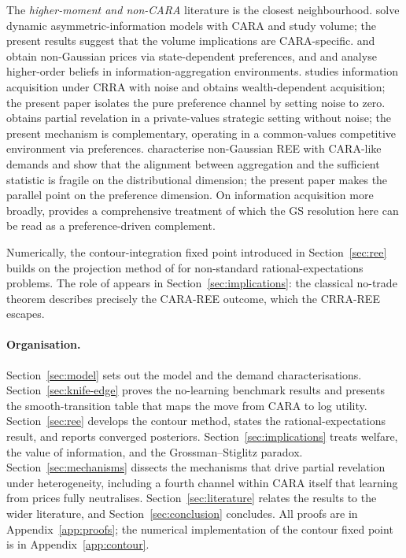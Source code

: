 \documentclass[12pt,letterpaper]{article}
\theoremstyle{definition}
\theoremstyle{remark}
\newcommand{\1}{\mathbf{1}}
\begin{document}
The \emph{higher-moment and non-CARA} literature is the closest
neighbourhood. \citet{Wang1993,Wang1994} solve dynamic
asymmetric-information models with CARA and study volume; the present
results suggest that the volume implications are CARA-specific.
\citet{BarlevyVeronesi2003} and \citet{Mele2007} obtain non-Gaussian
prices via state-dependent preferences, and \citet{AllenMorrisShin2006}
and \citet{KasaWalkerWhiteman2014} analyse higher-order beliefs in
information-aggregation environments. \citet{Peress2004} studies
information acquisition under CRRA with noise and obtains
wealth-dependent acquisition; the present paper isolates the pure
preference channel by setting noise to zero. \citet{Vives2011} obtains
partial revelation in a private-values strategic setting without noise;
the present mechanism is complementary, operating in a common-values
competitive environment via preferences.
\citet{AlbagliHellwigTsyvinski2024} characterise non-Gaussian REE with
CARA-like demands and show that the alignment between aggregation and
the sufficient statistic is fragile on the distributional dimension; the
present paper makes the parallel point on the preference dimension. On
information acquisition more broadly, \citet{VeldkampBook} provides a
comprehensive treatment of which the GS resolution here can be read as a
preference-driven complement.

Numerically, the contour-integration fixed point introduced in
Section~\ref{sec:ree} builds on the projection method of
\citet{BreugemBuss2019} for non-standard rational-expectations problems.
The role of \citet{Milgrom1982} appears in Section~\ref{sec:implications}: the
classical no-trade theorem describes precisely the CARA-REE outcome,
which the CRRA-REE escapes.

\paragraph{Organisation.}
Section~\ref{sec:model} sets out the model and the demand
characterisations. Section~\ref{sec:knife-edge} proves the no-learning
benchmark results and presents the smooth-transition table that maps the
move from CARA to log utility. Section~\ref{sec:ree} develops the contour
method, states the rational-expectations result, and reports converged
posteriors. Section~\ref{sec:implications} treats welfare, the value of
information, and the Grossman--Stiglitz paradox.
Section~\ref{sec:mechanisms} dissects the mechanisms that drive
partial revelation under heterogeneity, including a fourth channel within
CARA itself that learning from prices fully neutralises.
Section~\ref{sec:literature} relates
the results to the wider literature, and Section~\ref{sec:conclusion}
concludes. All proofs are in Appendix~\ref{app:proofs}; the numerical
implementation of the contour fixed point is in Appendix~\ref{app:contour}.
\end{document}
